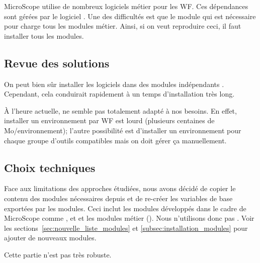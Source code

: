 MicroScope utilise de nombreux logiciels métier pour les WF.
Ces dépendances sont gérées par le logiciel .
Une des difficultés est que le module  qui est nécessaire pour 
charge tous les modules métier.
Ainsi, si on veut reproduire ceci, il faut installer tous les modules.

\subsection{Revue des solutions}

On peut bien sûr installer les logiciels dans des modules indépendants .
Cependant, cela conduirait rapidement à un temps d'installation très long.

À l'heure actuelle,  ne semble pas totalement adapté à nos besoins.
En effet, installer un environnement par WF est lourd (plusieurs centaines de Mo/environnement);
l'autre possibilité est d'installer un environnement pour chaque groupe d'outils compatibles mais on doit gérer ça manuellement.

\subsection{Choix techniques}

Face aux limitations des approches étudiées, nous avons décidé de copier le contenu des modules nécessaires depuis 
et de re-créer les variables de base exportées par les modules.
Ceci inclut les modules développés dans le cadre de MicroScope comme ,  et 
et les modules métier ().
Nous n'utilisons donc pas .
Voir les sections~\ref{sec:nouvelle_liste_modules} et \ref{subsec:installation_modules} pour ajouter de nouveaux modules.

\begin{warningbox}
    Cette partie n'est pas très robuste.
\end{warningbox}
